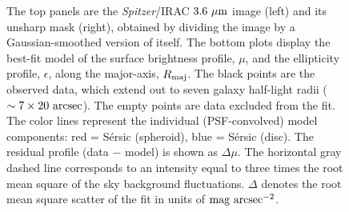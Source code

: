 \documentclass[useAMS,usenatbib,article]{mn2e}
\begin{document}
\begin{figure}
\begin{center}
{The top panels are the \emph{Spitzer}/IRAC $3.6~\rm \mu m$ image (left) and its unsharp mask (right), 
obtained by dividing the image by a Gaussian-smoothed version of itself. 
The bottom plots display the best-fit model of the surface brightness profile, $\mu$, 
and the ellipticity profile, $\epsilon$, 
along the major-axis, $R_{\rm maj}$. 
The black points are the observed data, which extend out to seven galaxy half-light radii ($\sim 7 \times 20~\rm arcsec$). 
The empty points are data excluded from the fit.   
The color lines represent the individual (PSF-convolved) model components: 
red = S\'ersic (spheroid), blue = S\'ersic (disc). 
The residual profile (data $-$ model) is shown as $\Delta \mu$. 
The horizontal gray dashed line corresponds to an intensity equal to three times the root mean square of the sky background fluctuations. 
$\Delta$ denotes the root mean square scatter of the fit in units of $\rm mag~arcsec^{-2}$.
}
\label{fig:n1332}
\end{center}
\end{figure}
\end{document}
